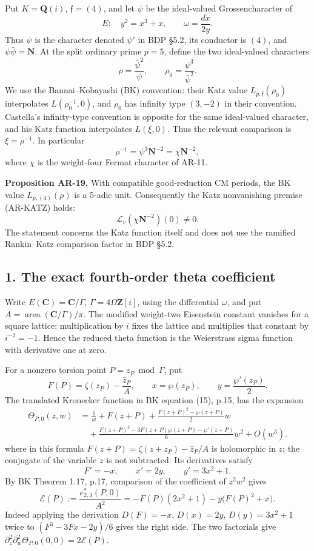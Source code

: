 \documentclass[11pt,a4paper]{article}
\begin{document}
Put \(K=\mathbf Q(i)\), \(\mathfrak f=(4)\), and let \(\psi\) be the
ideal-valued Grossencharacter of \[
E:\quad y^2=x^3+x,\qquad \omega=\frac{dx}{2y}.
\] Thus \(\psi\) is the character denoted \(\psi'\) in BDP §5.2, its
conductor is \((4)\), and \(\psi\bar\psi=\mathbf N\). At the split
ordinary prime \(p=5\), define the two ideal-valued characters \[
\rho=\frac{\bar\psi^2}{\psi},\qquad
\rho_0=\frac{\psi^3}{\bar\psi^2}.
\tag{AR19.1}
\] We use the Bannai--Kobayashi (BK) convention: their Katz value
\(L_{p,\mathfrak f}(\rho_0)\) interpolates \(L(\rho_0^{-1},0)\), and
\(\rho_0\) has infinity type \((3,-2)\) in their convention. Castella's
infinity-type convention is opposite for the same ideal-valued
character, and his Katz function interpolates \(L(\xi,0)\). Thus the
relevant comparison is \(\xi=\rho^{-1}\). In particular \[
\rho^{-1}=\psi^3\mathbf N^{-2}=\chi\mathbf N^{-2},
\] where \(\chi\) is the weight-four Fermat character of AR-11.

\textbf{Proposition AR-19.} With compatible good-reduction CM periods,
the BK value \(L_{p,(4)}(\rho)\) is a 5-adic unit. Consequently the Katz
nonvanishing premise (AR-KATZ) holds: \[
\mathcal L_v(\chi\mathbf N^{-2})(0)\ne0.
\tag{AR19.2}
\] The statement concerns the Katz function itself and does not use the
ramified Rankin--Katz comparison factor in BDP §5.2.

\subsection{1. The exact fourth-order theta
coefficient}\label{the-exact-fourth-order-theta-coefficient}

Write \(E(\mathbf C)=\mathbf C/\Gamma\), \(\Gamma=4\Omega\mathbf Z[i]\),
using the differential \(\omega\), and put
\(A=\operatorname{area}(\mathbf C/\Gamma)/\pi\). The modified weight-two
Eisenstein constant vanishes for a square lattice: multiplication by
\(i\) fixes the lattice and multiplies that constant by \(i^{-2}=-1\).
Hence the reduced theta function is the Weierstrass sigma function with
derivative one at zero.

For a nonzero torsion point \(P=z_P\bmod\Gamma\), put \[
F(P)=\zeta(z_P)-\frac{\bar z_P}{A},\qquad
x=\wp(z_P),\qquad y=\frac{\wp'(z_P)}2.
\] The translated Kronecker function in BK equation (15), p.15, has the
expansion \[
\begin{aligned}
\Theta_{P,0}(z,w)&=\frac1w+F(z+P)
 +\frac{F(z+P)^2-\wp(z+P)}2w\\
&\quad +\frac{F(z+P)^3-3F(z+P)\wp(z+P)-\wp'(z+P)}6w^2+O(w^3).
\end{aligned}
\] where in this formula \(F(z+P)=\zeta(z+z_P)-\bar z_P/A\) is
holomorphic in \(z\); the conjugate of the variable \(z\) is not
subtracted. Its derivatives satisfy \[
F'=-x,\qquad x'=2y,\qquad y'=3x^2+1.
\] By BK Theorem 1.17, p.17, comparison of the coefficient of \(z^2w^2\)
gives \[
\mathcal E(P):=\frac{e^*_{2,3}(P,0)}{A^2}
 =-F(P)(2x^2+1)-y\bigl(F(P)^2+x\bigr).
\tag{AR19.3}
\] Indeed applying the derivation \(D(F)=-x\), \(D(x)=2y\),
\(D(y)=3x^2+1\) twice to \((F^3-3Fx-2y)/6\) gives the right side. The
two factorials give
\(\partial_z^2\partial_w^2\Theta_{P,0}(0,0)=2\mathcal E(P)\).
\end{document}
